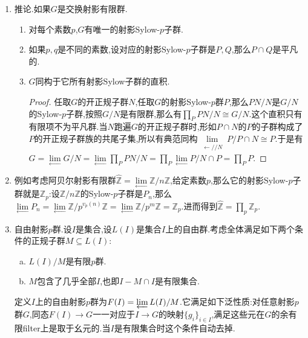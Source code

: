 \begin{enumerate}
\begin{enumerate}
\begin{proof}
    		按照定义有$[G:P]=\mathrm{lcm}_{N\in\mathscr{N}}[G/N:PN/N]$,这里$PN/N$是$G/N$的Sylow-$p$子群,所以这些指数$[G/N:PN/N]$都和$p$互素,取最小公倍数也就和$p$互素.
    	\end{proof}
    	\item 特别的,(a)和(c)说明$G$的射影Sylow-$p$子群非平凡当且仅当$p$整除超自然数$|G|$.
    \end{enumerate}
    \item 推论.如果$G$是交换射影有限群.
    \begin{enumerate}
    	\item 对每个素数$p$,$G$有唯一的射影Sylow-$p$子群.
    	\item 如果$p,q$是不同的素数,设对应的射影Sylow-$p$子群是$P,Q$,那么$P\cap Q$是平凡的.
    	\item $G$同构于它所有射影Sylow子群的直积.
    	\begin{proof}
    		
    		任取$G$的开正规子群$N$,任取$G$的射影Sylow-$p$群$P$,那么$PN/N$是$G/N$的Sylow-$p$子群,按照$G/N$是有限群,那么有$\prod_PPN/N\cong G/N$.这个直积只有有限项不为平凡群.当$N$跑遍$G$的开正规子群时,形如$P\cap N$的$P$的子群构成了$P$的开正规子群族的共尾子集,所以有典范同构$\lim\limits_{\substack{\leftarrow//N}}P/P\cap N\cong P$.于是有$G=\lim\limits_{\leftarrow}G/N=\lim\limits_{\leftarrow}\prod_P PN/N=\prod_P\lim\limits_{\leftarrow}P/N\cap P=\prod_PP$.
    	\end{proof}
    \end{enumerate}
    \item 例如考虑阿贝尔射影有限群$\widehat{\mathbb{Z}}=\lim\limits_{\leftarrow}\mathbb{Z}/n\mathbb{Z}$,给定素数$p$,那么它的射影Sylow-$p$子群就是$\mathbb{Z}_p$:设$\mathbb{Z}/n\mathbb{Z}$的Sylow-$p$子群是$P_n$,那么$\lim\limits_{\leftarrow}P_n=\lim\limits_{\leftarrow}\mathbb{Z}/p^{v_p(n)}\mathbb{Z}=\lim\limits_{\leftarrow}\mathbb{Z}/p^m\mathbb{Z}=\mathbb{Z}_p$.进而得到$\widehat{\mathbb{Z}}=\prod_p\mathbb{Z}_p$.
    \item 自由射影$p$群.设$I$是集合,设$L(I)$是集合$I$上的自由群.考虑全体满足如下两个条件的正规子群$M\subseteq L(I)$:
    \begin{enumerate}[(a)]
    	\item $L(I)/M$是有限$p$群.
    	\item $M$包含了几乎全部$I$,也即$I-M\cap I$是有限集合.
    \end{enumerate}
    定义$I$上的自由射影$p$群为$F(I)=\varprojlim L(I)/M$.它满足如下泛性质:对任意射影$p$群$G$,同态$F(I)\to G$一一对应于$I\to G$的映射$\{g_i\}_{i\in I}$,满足这些元在$G$的余有限filter上是取于幺元的.当$I$是有限集合时这个条件自动去掉.
\end{enumerate}




